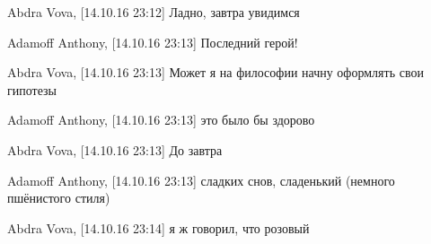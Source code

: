 Abdra Vova, [14.10.16 23:12]
Ладно, завтра увидимся

Adamoff Anthony, [14.10.16 23:13]
Последний герой!

Abdra Vova, [14.10.16 23:13]
Может я на философии начну оформлять свои гипотезы

Adamoff Anthony, [14.10.16 23:13]
это было бы здорово

Abdra Vova, [14.10.16 23:13]
До завтра

Adamoff Anthony, [14.10.16 23:13]
сладких снов, сладенький (немного пшёнистого стиля)

Abdra Vova, [14.10.16 23:14]
я ж говорил, что розовый

{\small{}}

{\tiny{}}
